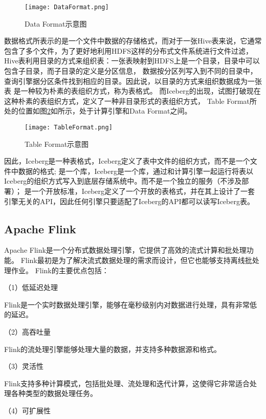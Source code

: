 \begin{figure}[H]
  \centering
  \texttt{[image: DataFormat.png]}
  \caption{Data Format示意图}
  \label{fig:DataFormat}
\end{figure}

数据格式所表示的是一个文件中数据的存储格式，而对于一张Hive表来说，它通常包含了多个文件，为了更好地利用HDFS\cite{13}这样的分布式文件系统进行文件过滤，
Hive表利用目录的方式来组织表：一张表映射到HDFS上是一个目录，目录中可以包含子目录，而子目录的定义是分区信息，
数据按分区列写入到不同的目录中，查询引擎据分区条件找到相应的目录。因此说，以目录的方式来组织数据成为一张表
是一种较为朴素的表组织方式，称为表格式。
而Iceberg的出现，试图打破现在这种朴素的表组织方式，定义了一种非目录形式的表组织方式，
Table Format所处的位置如图\ref{fig:TableFormat}如所示，处于计算引擎和Data Format之间。

\begin{figure}[H]
  \centering
  \texttt{[image: TableFormat.png]}
  \caption{Table Format示意图}
  \label{fig:TableFormat}
\end{figure}

因此，Iceberg是一种表格式，Iceberg定义了表中文件的组织方式，而不是一个文件中数据的格式;
是一个库，Iceberg是一个库，通过和计算引擎一起运行将表以Iceberg的组织方式写入到底层存储系统中\cite{26}。而不是一个独立的服务（不涉及部署）；
是一个开放标准，Iceberg定义了一个开放的表格式，并在其上设计了一套引擎无关的API，因此任何引擎只要适配了Iceberg的API都可以读写Iceberg表。

\subsection{Apache Flink}

Apache Flink是一个分布式数据处理引擎，它提供了高效的流式计算和批处理功能。
Flink最初是为了解决流式数据处理的需求而设计，但它也能够支持离线批处理作业\cite{24}。
Flink的主要优点包括：

（1）低延迟处理

Flink是一个实时数据处理引擎，能够在毫秒级别内对数据进行处理，具有非常低的延迟。

（2）高吞吐量

Flink的流处理引擎能够处理大量的数据，并支持多种数据源和格式。

（3）灵活性

Flink支持多种计算模式，包括批处理、流处理和迭代计算，这使得它非常适合处理各种类型的数据处理任务。

（4）可扩展性

